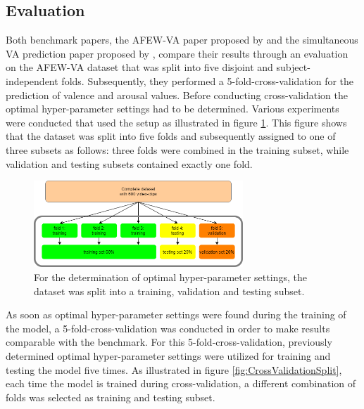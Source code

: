 \subsection{Evaluation} \label{sec:TrainValTestSplit}
Both benchmark papers, the AFEW-VA paper proposed by \citet{Kossaifi:2017:AFEW-VADatabase} and the simultaneous VA prediction paper proposed by \citet{Handrich:2020:SimultaneousPredVA}, compare their results through an evaluation on the AFEW-VA dataset that was split into five disjoint and subject-independent folds. Subsequently, they performed a 5-fold-cross-validation for the prediction of valence and arousal values. 
\newline\newline
Before conducting cross-validation the optimal hyper-parameter settings had to be determined. Various experiments were conducted that used the setup as illustrated in figure \ref{fig:TrainTestSplit}. This figure shows that the dataset was split into five folds and subsequently assigned to one of three subsets as follows: three folds were combined in the training subset, while validation and testing subsets contained exactly one fold.

\begin{figure}[H]
  \begin{center}
  \includegraphics[angle=0, width=0.7\textwidth]{Figures/TrainTestSplit.png}
  \caption{For the determination of optimal hyper-parameter settings, the dataset was split into a training, validation and testing subset.}
  \label{fig:TrainTestSplit}
  \end{center}
\end{figure}

As soon as optimal hyper-parameter settings were found during the training of the model, a 5-fold-cross-validation was conducted in order to make results comparable with the benchmark. For this 5-fold-cross-validation, previously determined optimal hyper-parameter settings were utilized for training and testing the model five times. As illustrated in figure \ref{fig:CrossValidationSplit}, each time the model is trained during cross-validation, a different combination of folds was selected as training and testing subset.\newline

